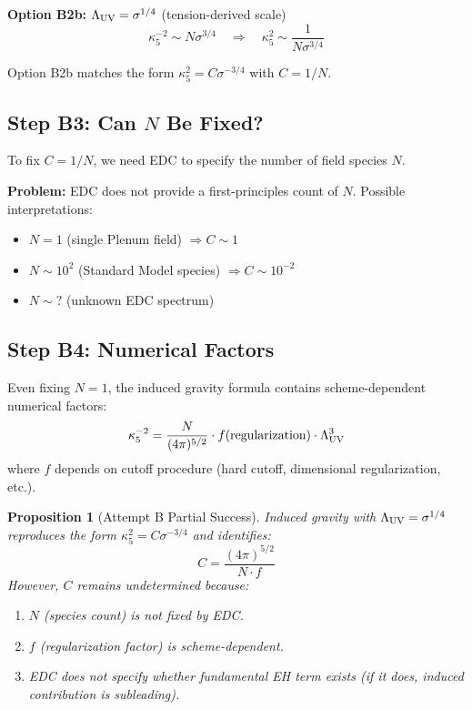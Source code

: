 \documentclass[11pt,a4paper]{article}
\newtheorem{proposition}{Proposition}
\theoremstyle{definition}
\begin{document}
\textbf{Option B2b:} $\Lambda_{\rm UV} = \sigma^{1/4}$ (tension-derived scale)
\begin{equation}
\kappa_5^{-2} \sim N \sigma^{3/4} \quad \Rightarrow \quad \kappa_5^2 \sim \frac{1}{N \sigma^{3/4}}
\end{equation}

Option B2b matches the form $\kappa_5^2 = C \sigma^{-3/4}$ with $C = 1/N$.

\subsection{Step B3: Can $N$ Be Fixed?}

To fix $C = 1/N$, we need EDC to specify the number of field species $N$.

\textbf{Problem:} EDC does not provide a first-principles count of $N$. Possible
interpretations:
\begin{itemize}
\item $N = 1$ (single Plenum field) $\Rightarrow C \sim 1$
\item $N \sim 10^2$ (Standard Model species) $\Rightarrow C \sim 10^{-2}$
\item $N \sim ?$ (unknown EDC spectrum)
\end{itemize}

\subsection{Step B4: Numerical Factors}

Even fixing $N = 1$, the induced gravity formula contains scheme-dependent
numerical factors:
\begin{equation}
\kappa_5^{-2} = \frac{N}{(4\pi)^{5/2}} \cdot f(\text{regularization}) \cdot \Lambda_{\rm UV}^3
\end{equation}
where $f$ depends on cutoff procedure (hard cutoff, dimensional regularization, etc.).

\begin{proposition}[Attempt B Partial Success]
Induced gravity with $\Lambda_{\rm UV} = \sigma^{1/4}$ reproduces the form
$\kappa_5^2 = C \sigma^{-3/4}$ and identifies:
\begin{equation}
C = \frac{(4\pi)^{5/2}}{N \cdot f}
\end{equation}
However, $C$ remains undetermined because:
\begin{enumerate}
\item $N$ (species count) is not fixed by EDC.
\item $f$ (regularization factor) is scheme-dependent.
\item EDC does not specify whether fundamental EH term exists (if it does,
induced contribution is subleading).
\end{enumerate}
\end{proposition}
\end{document}

